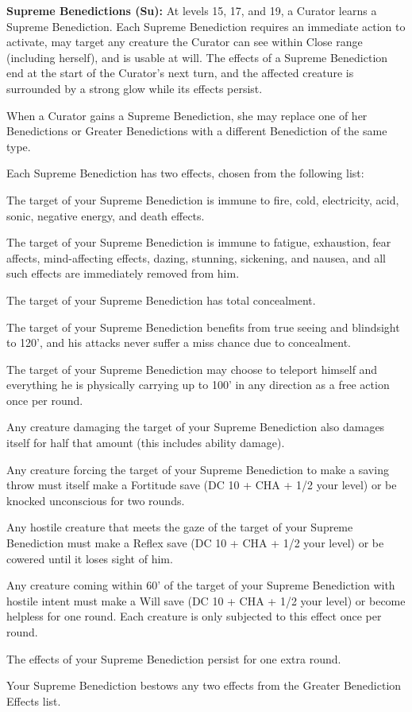 \textbf{Supreme Benedictions (Su):} At levels 15, 17, and 19, a Curator learns a Supreme Benediction. Each Supreme Benediction requires an immediate action to activate, may target any creature the Curator can see within Close range (including herself), and is usable at will. The effects of a Supreme Benediction end at the start of the Curator's next turn, and the affected creature is surrounded by a strong glow while its effects persist.

When a Curator gains a Supreme Benediction, she may replace one of her Benedictions or Greater Benedictions with a different Benediction of the same type.

Each Supreme Benediction has two effects, chosen from the following list:
\begin{itemize*}
\item The target of your Supreme Benediction is immune to fire, cold, electricity, acid, sonic, negative energy, and death effects.
\item The target of your Supreme Benediction is immune to fatigue, exhaustion, fear affects, mind-affecting effects, dazing, stunning, sickening, and nausea, and all such effects are immediately removed from him.
\item The target of your Supreme Benediction has total concealment.
\item The target of your Supreme Benediction benefits from true seeing and blindsight to 120', and his attacks never suffer a miss chance due to concealment.
\item The target of your Supreme Benediction may choose to teleport himself and everything he is physically carrying up to 100' in any direction as a free action once per round.
\item Any creature damaging the target of your Supreme Benediction also damages itself for half that amount (this includes ability damage).
\item Any creature forcing the target of your Supreme Benediction to make a saving throw must itself make a Fortitude save (DC 10 + CHA + 1/2 your level) or be knocked unconscious for two rounds.
\item Any hostile creature that meets the gaze of the target of your Supreme Benediction must make a Reflex save (DC 10 + CHA + 1/2 your level) or be cowered until it loses sight of him.
\item Any creature coming within 60' of the target of your Supreme Benediction with hostile intent must make a Will save (DC 10 + CHA + 1/2 your level) or become helpless for one round. Each creature is only subjected to this effect once per round.
\item The effects of your Supreme Benediction persist for one extra round.
\item Your Supreme Benediction bestows any two effects from the Greater Benediction Effects list.
\end{itemize*}

